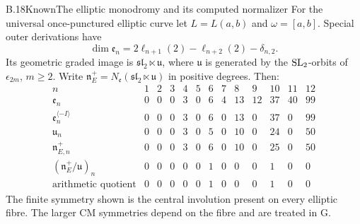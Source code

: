 \begin{statement}{B.18}{Known}{The elliptic monodromy and its computed normalizer}
For the universal once-punctured elliptic curve let
$L=L(a,b)$ and $\omega=[a,b]$. Special outer
derivations have
\[
 \dim\mathfrak e_n=2\ell_{n+1}(2)-\ell_{n+2}(2)
                    -\delta_{n,2}.
\]
Its geometric graded image is
$\mathfrak{sl}_2\ltimes\mathfrak u$, where
$\mathfrak u$ is generated by the $\operatorname{SL}_2$-orbits of
$\epsilon_{2m}$, $m\ge2$. Write
$\mathfrak n_E^+=N_{\mathfrak e}(\mathfrak{sl}_2
\ltimes\mathfrak u)$ in positive degrees. Then:
\[
\begin{array}{c|rrrrrrrrrrrr}
n&1&2&3&4&5&6&7&8&9&10&11&12\\ \hline
\mathfrak e_n&0&0&0&3&0&6&4&13&12&37&40&99\\
\mathfrak e_n^{\langle-I\rangle}
 &0&0&0&3&0&6&0&13&0&37&0&99\\
\mathfrak u_n&0&0&0&3&0&5&0&10&0&24&0&50\\
\mathfrak n_{E,n}^+&0&0&0&3&0&6&0&10&0&25&0&50\\
(\mathfrak n_E^+/\mathfrak u)_n
 &0&0&0&0&0&1&0&0&0&1&0&0\\
\text{arithmetic quotient}
 &0&0&0&0&0&1&0&0&0&1&0&0
\end{array}
\]
The finite symmetry shown is the central involution
present on every elliptic fibre. The larger CM
symmetries depend on the fibre and are treated in G.
\end{statement}
